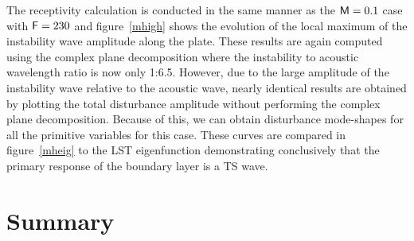 The receptivity calculation is conducted in the same manner as the ${\sf M}=0.1$
case with ${\sf F}=230$ and figure~\ref{mhigh} shows the evolution of the local
maximum of the instability wave amplitude along the plate.  These results are
again computed using the complex plane decomposition \cite{Wlezien:94} where
the instability to acoustic wavelength ratio is now only 1:6.5.  However, due
to the large amplitude of the instability wave relative to the acoustic wave,
nearly identical results are obtained by plotting the total disturbance
amplitude without performing the complex plane decomposition.  Because of
this, we can obtain disturbance mode-shapes for all the primitive variables
for this case.  These curves are compared in figure~\ref{mheig} to the LST
eigenfunction demonstrating conclusively that the primary response of the
boundary layer is a TS wave.

\section{Summary}

